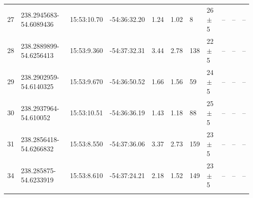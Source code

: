 \begin{table}[htbp!]
\begin{tabular}{llllllllccc}
27  &  238.2945683-54.6089436  &  15:53:10.70  &  -54:36:32.20  &  1.24  &  1.02  &  8  &  26 $\pm$ 5  &  --  &  --  &  -- \\
28  &  238.2889899-54.6256413  &  15:53:9.360  &  -54:37:32.31  &  3.44  &  2.78  &  138  &  22 $\pm$ 5  &  --  &  --  &  -- \\
29  &  238.2902959-54.6140325  &  15:53:9.670  &  -54:36:50.52  &  1.66  &  1.56  &  59  &  24 $\pm$ 5  &  --  &  --  &  -- \\
30  &  238.2937964-54.610052  &  15:53:10.51  &  -54:36:36.19  &  1.43  &  1.18  &  88  &  25 $\pm$ 5  &  --  &  --  &  -- \\
31  &  238.2856418-54.6266832  &  15:53:8.550  &  -54:37:36.06  &  3.37  &  2.73  &  159  &  23 $\pm$ 5  &  --  &  --  &  -- \\
34  &  238.285875-54.6233919  &  15:53:8.610  &  -54:37:24.21  &  2.18  &  1.52  &  149  &  23 $\pm$ 5  &  --  &  --  &  -- \\

\hline \noalign {\smallskip}
\end{tabular}
\end{table}

